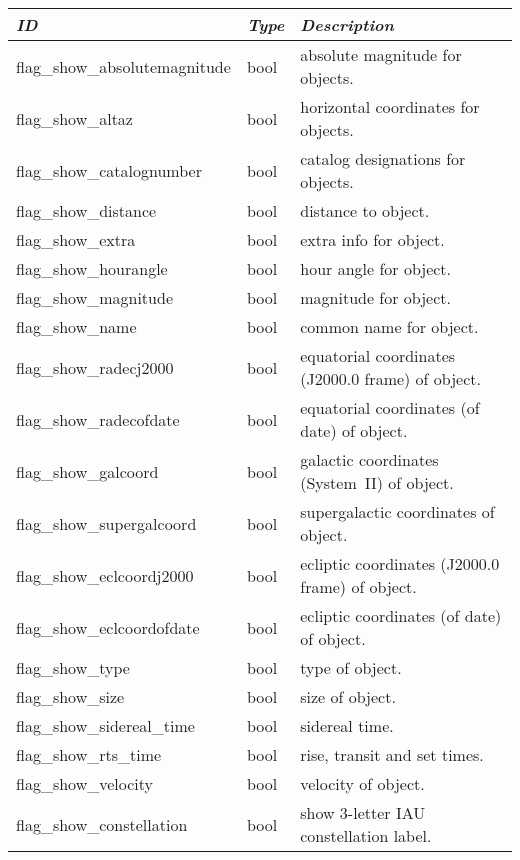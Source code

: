 \begin{longtable}{l|l|l}\toprule
\emph{ID} & \emph{Type} & \emph{Description}\\\midrule
flag\_show\_absolutemagnitude & bool & absolute magnitude for objects.\\%
flag\_show\_altaz             & bool & horizontal coordinates for objects.\\%
flag\_show\_catalognumber     & bool & catalog designations for objects.\\%
flag\_show\_distance          & bool & distance to object.\\%
flag\_show\_extra             & bool & extra info for object.\\%
flag\_show\_hourangle         & bool & hour angle for object.\\%
flag\_show\_magnitude         & bool & magnitude for object.\\%
flag\_show\_name              & bool & common name for object.\\%
flag\_show\_radecj2000        & bool & equatorial coordinates (J2000.0 frame) of object.\\%
flag\_show\_radecofdate       & bool & equatorial coordinates (of date) of object.\\%
flag\_show\_galcoord          & bool & galactic coordinates (System~II) of object.\\%
flag\_show\_supergalcoord     & bool & supergalactic coordinates of object.\\%
flag\_show\_eclcoordj2000     & bool & ecliptic coordinates (J2000.0 frame) of object.\\%
flag\_show\_eclcoordofdate    & bool & ecliptic coordinates (of date) of object.\\%
flag\_show\_type              & bool & type of object.\\%
flag\_show\_size              & bool & size of object.\\%
flag\_show\_sidereal\_time    & bool & sidereal time.\\%
flag\_show\_rts\_time         & bool & rise, transit and set times.\\%
flag\_show\_velocity          & bool & velocity of object.\\%
flag\_show\_constellation     & bool & show 3-letter IAU\index{IAU} constellation label.\\\bottomrule
\end{longtable}

